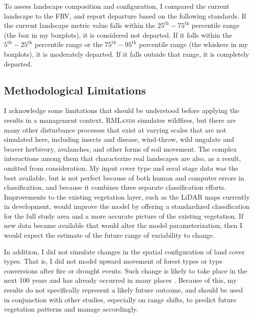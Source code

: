 To assess landscape composition and configuration, I compared the current landscape to the FRV, and report departure based on the following standards. If the current landscape metric value falls within the $25^{\text{th}}-75^{\text{th}}$ percentile range (the box in my boxplots), it is considered not departed. If it falls within the $5^{\text{th}}-25^{\text{th}}$ percentile range or the $75^{\text{th}}-95^{\text{th}}$ percentile range (the whiskers in my boxplots), it is moderately departed. If it falls outside that range, it is completely departed.



\subsection*{Methodological Limitations} %
I acknowledge some limitations that should be understood before applying the results in a management context. \textsc{RMLands} simulates wildfires, but there are many other disturbance processes that exist at varying scales that are not simulated here, including insects and disease, wind-throw, wild ungulate and beaver herbivory, avalanches, and other forms of soil movement. The complex interactions among them that characterize real landscapes are also, as a result, omitted from consideration. %
My input cover type and seral stage data was the best available, but is not perfect because of both human and computer errors in classification, and because it combines three separate classification efforts. Improvements to the existing vegetation layer, such as the LiDAR maps currently in development, would improve the model by offering a standardized classification for the full study area and a more accurate picture of the existing vegetation. If new data became available that would alter the model parameterization, then I would expect the estimate of the future range of variability to change. 

In addition, I did not simulate changes in the spatial configuration of land cover types. That is, I did not model upward movement of forest types or type conversions after fire or drought events. Such change is likely to take place in the next 100 years and has already occurred in many places \citep{Bachelet2001}. Because of this, my results do not specifically represent a likely future outcome, and should be used in conjunction with other studies, especially on range shifts, to predict future vegetation patterns and manage accordingly. 

